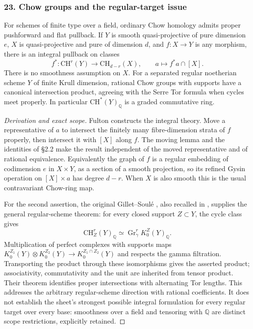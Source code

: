 \subsubsection{23. Chow groups and the regular-target issue}
\begin{proposition}\label{B:subject23}
For schemes of finite type over a field, ordinary Chow homology admits proper pushforward and flat pullback. If $Y$ is smooth quasi-projective of pure dimension $e$, $X$ is quasi-projective and pure of dimension $d$, and $f:X\to Y$ is any morphism, there is an integral pullback on classes
\[
 f^*: \mathrm{CH}^r(Y)\longrightarrow\mathrm{CH}_{d-r}(X),
 \qquad a\longmapsto f^*a\cap[X].
\]
There is no smoothness assumption on $X$. For a separated regular noetherian scheme $Y$ of finite Krull dimension, rational Chow groups with supports have a canonical intersection product, agreeing with the Serre Tor formula when cycles meet properly. In particular $\mathrm{CH}^*(Y)_{\mathbb Q}$ is a graded commutative ring.
\end{proposition}
\begin{proof}[Derivation and exact scope]
Fulton \cite[\S\S1--3, especially the moving lemma in \S2.3 and the cap product in \S3.1]{BFulton1975} constructs the integral theory. Move a representative of $a$ to intersect the finitely many fibre-dimension strata of $f$ properly, then intersect it with $[X]$ along $f$. The moving lemma and the identities of \S2.2 make the result independent of the moved representative and of rational equivalence. Equivalently the graph of $f$ is a regular embedding of codimension $e$ in $X\times Y$, as a section of a smooth projection, so its refined Gysin operation on $[X]\times a$ has degree $d-r$. When $X$ is also smooth this is the usual contravariant Chow-ring map.

For the second assertion, the original Gillet--Soul\'e \cite[Theorems 8.2 and 8.3 (Theorem C), pp.~274--276]{BGilletSoule1987}, also recalled in \cite[\S4.1.1]{BGilletSoule1990}, supplies the general regular-scheme theorem: for every closed support $Z\subset Y$, the cycle class gives
\[
 \mathrm{CH}^r_Z(Y)_{\mathbb Q}
 \simeq\operatorname{Gr}^r_\gamma K_0^Z(Y)_{\mathbb Q}.
\]
Multiplication of perfect complexes with supports maps
$K_0^{Z_1}(Y)\otimes K_0^{Z_2}(Y)\to K_0^{Z_1\cap Z_2}(Y)$ and respects the gamma filtration. Transporting the product through these isomorphisms gives the asserted product; associativity, commutativity and the unit are inherited from tensor product. Their theorem identifies proper intersections with alternating Tor lengths. This addresses the arbitrary regular-scheme direction with rational coefficients. It does not establish the sheet's strongest possible integral formulation for every regular target over every base: smoothness over a field and tensoring with $\mathbb Q$ are distinct scope restrictions, explicitly retained.
\end{proof}


